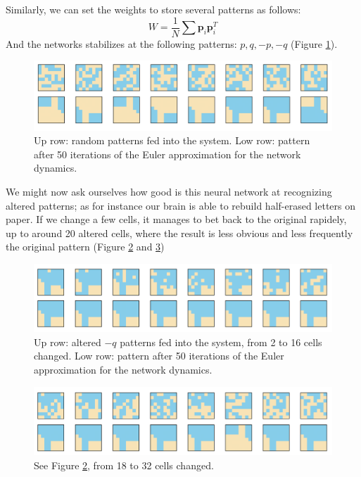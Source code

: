\documentclass{article}
\begin{document}
Similarly, we can set the weights to store several patterns as follows:
\begin{equation}\label{eq:10}
  W=\frac{1}{N}\sum\mathbf{p}_i\mathbf{p}_i^T
\end{equation}
\indent And the networks stabilizes at the following patterns: $p,q, -p, -q$ (Figure \ref{fig:pat}).

\begin{figure}[H]
\centering
\includegraphics[width=.8\linewidth]{exercice5fig11.png}
\caption[spt]{Up row: random patterns fed into the system. Low row: pattern after 50 iterations of the Euler approximation for the network dynamics.}\label{fig:pat}
\end{figure}

\indent We might now ask ourselves how good is this neural network at recognizing altered patterns; as for instance our brain is able to rebuild half-erased letters on paper. If we change a few cells, it manages to bet back to the original rapidely, up to around 20 altered cells, where the result is less obvious and less frequently the original pattern (Figure \ref{fig:fig11} and \ref{fig:fig12})


\begin{figure}[H]
\centering
\includegraphics[width=.8\linewidth]{exercice5fig12.png}
\caption[spt]{Up row: altered $-q$ patterns fed into the system, from 2 to 16 cells changed. Low row: pattern after 50 iterations of the Euler approximation for the network dynamics.}\label{fig:fig11}
\end{figure}

\begin{figure}[H]
\centering
\includegraphics[width=.8\linewidth]{exercice5fig13.png}
\caption[spt]{See Figure \ref{fig:fig11}, from 18 to 32 cells changed.}\label{fig:fig12}
\end{figure}
\end{document}
